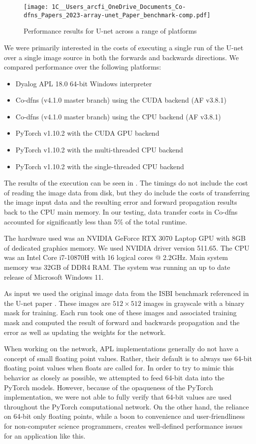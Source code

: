 \documentclass[10pt,twocolumn,english,format=sigplan,screen,balance]{acmart}
\begin{document}
\begin{figure*}
\texttt{[image: 1C\_\_Users\_arcfi\_OneDrive\_Documents\_Co-dfns\_Papers\_2023-array-unet\_Paper\_benchmark-comp.pdf]}

\caption{Performance results for U-net across a range of platforms\label{fig:Performance-results-for}}
\end{figure*}
We were primarily interested in the costs of executing a single run
of the U-net over a single image source in both the forwards and backwards
directions. We compared performance over the following platforms:
\begin{itemize}
\item Dyalog APL 18.0 64-bit Windows interpreter
\item Co-dfns (v4.1.0 master branch) using the CUDA backend (AF v3.8.1)
\item Co-dfns (v4.1.0 master branch) using the CPU backend (AF v3.8.1)
\item PyTorch v1.10.2 with the CUDA GPU backend
\item PyTorch v1.10.2 with the multi-threaded CPU backend
\item PyTorch v1.10.2 with the single-threaded CPU backend
\end{itemize}
The results of the execution can be seen in .
The timings do not include the cost of reading the image data from
disk, but they do include the costs of transferring the image input
data and the resulting error and forward propagation results back
to the CPU main memory. In our testing, data transfer costs in Co-dfns
accounted for significantly less than 5\% of the total runtime. 

The hardware used was an NVIDIA GeForce RTX 3070 Laptop GPU with 8GB
of dedicated graphics memory. We used NVIDIA driver version 511.65.
The CPU was an Intel Core i7-10870H with 16 logical cores @ 2.2GHz.
Main system memory was 32GB of DDR4 RAM. The system was running an
up to date release of Microsoft Windows 11. 

As input we used the original image data from the ISBI benchmark referenced
in the U-net paper \citep{unet,isbi-data}. These images are $512\times512$
images in grayscale with a binary mask for training. Each run took
one of these images and associated training mask and computed the
result of forward and backwards propagation and the error as well
as updating the weights for the network. 

When working on the network, APL implementations generally do not
have a concept of small floating point values. Rather, their default
is to always use 64-bit floating point values when floats are called
for. In order to try to mimic this behavior as closely as possible,
we attempted to feed 64-bit data into the PyTorch models. However,
because of the opaqueness of the PyTorch implementation, we were not
able to fully verify that 64-bit values are used throughout the PyTorch
computational network. On the other hand, the reliance on 64-bit only
floating points, while a boon to convenience and user-friendliness
for non-computer science programmers, creates well-defined performance
issues for an application like this.
\end{document}
